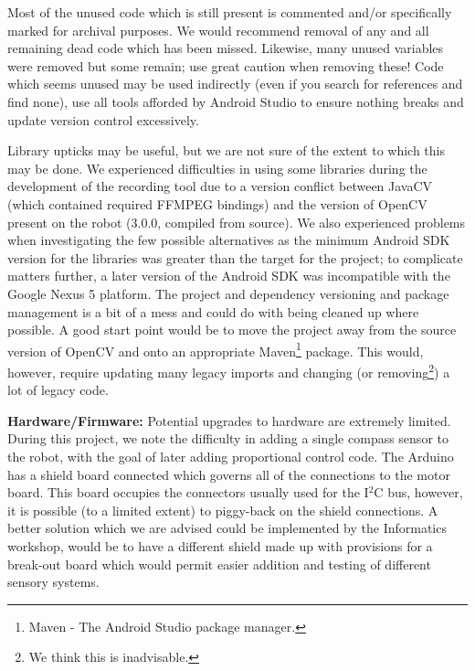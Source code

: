 \documentclass[a4paper,11pt,twoside,openright]{article}
\begin{document}
Most of the unused code which is still present is commented and/or
specifically marked for archival purposes. We would recommend
removal of any and all remaining dead code which has been
missed. Likewise, many unused variables were removed but some remain;
use great caution when removing these! Code which seems unused may be
used indirectly (even if you search for references and find none), use
all tools afforded by Android Studio to ensure nothing
breaks and update version control excessively.
\newline\par

Library upticks may be useful, but we are not sure of the extent to
which this may be done. We experienced difficulties in using some
libraries during the development of the recording tool due to a
version conflict between JavaCV (which contained required FFMPEG
bindings) and the version of OpenCV present on the robot (3.0.0,
compiled from source). We also experienced problems when investigating
the few possible alternatives as the minimum Android SDK version for
the libraries was greater than the target for the project; to
complicate matters further, a later version of the Android SDK was
incompatible with the Google Nexus 5 platform. The project and
dependency versioning and package management is a bit of a mess and
could do with being cleaned up where possible. A good start point
would be to move the project away from the source version of OpenCV
and onto an appropriate Maven\footnote{Maven - The Android Studio
  package manager.} package. This would, however, require updating
many legacy imports and changing (or removing\footnote{We think this
  is inadvisable.}) a lot of legacy code.\newline\par

\textbf{Hardware/Firmware:}
Potential upgrades to hardware are extremely limited. During this
project, we note the difficulty in adding a single compass sensor to
the robot, with the goal of later adding proportional control
code. The Arduino has a shield board connected which governs all of
the connections to the motor board. This board occupies the connectors
usually used for the I$^2$C bus, however, it is possible (to a limited
extent) to piggy-back on the shield connections. A better solution
which we are advised could be implemented by the Informatics workshop,
would be to have a different shield made up with provisions for a
break-out board which would permit easier addition and testing of
different sensory systems.\newline\par
\end{document}
